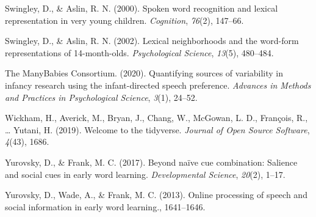 \documentclass[10pt, letterpaper]{article}
\begin{document}
\leavevmode\hypertarget{ref-Swingley2000}{}%
Swingley, D., \& Aslin, R. N. (2000). Spoken word recognition and
lexical representation in very young children. \emph{Cognition},
\emph{76}(2), 147--66.

\leavevmode\hypertarget{ref-Swingley2002}{}%
Swingley, D., \& Aslin, R. N. (2002). Lexical neighborhoods and the
word-form representations of 14-month-olds. \emph{Psychological
Science}, \emph{13}(5), 480--484.

\leavevmode\hypertarget{ref-TheManyBabiesConsortium2020}{}%
The ManyBabies Consortium. (2020). Quantifying sources of variability in
infancy research using the infant-directed speech preference.
\emph{Advances in Methods and Practices in Psychological Science},
\emph{3}(1), 24--52.

\leavevmode\hypertarget{ref-Wickham2019}{}%
Wickham, H., Averick, M., Bryan, J., Chang, W., McGowan, L. D.,
François, R., \ldots{} Yutani, H. (2019). Welcome to the tidyverse.
\emph{Journal of Open Source Software}, \emph{4}(43), 1686.

\leavevmode\hypertarget{ref-Yurovsky2017}{}%
Yurovsky, D., \& Frank, M. C. (2017). Beyond naïve cue combination:
Salience and social cues in early word learning. \emph{Developmental
Science}, \emph{20}(2), 1--17.

\leavevmode\hypertarget{ref-Yurovsky2013}{}%
Yurovsky, D., Wade, A., \& Frank, M. C. (2013). Online processing of
speech and social information in early word learning., 1641--1646.


\end{document}
